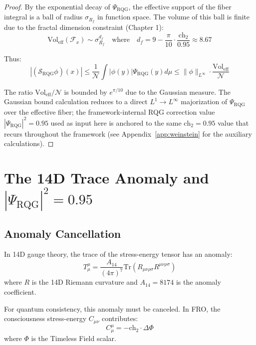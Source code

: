 \begin{proof}
By the exponential decay of $\Psi_{\text{RQG}}$, the effective support of the fiber integral is a ball of radius $\sigma_{R_f}$ in function space. The volume of this ball is finite due to the fractal dimension constraint (Chapter 1):
\begin{equation}
\text{Vol}_{\text{eff}}(\mathcal{F}_x) \sim \sigma_{R_f}^{d_f} \quad \text{where} \quad d_f = 9 - \frac{\pi}{10} \cdot \frac{\text{ch}_2}{0.95} \approx 8.67
\end{equation}

Thus:
\begin{equation}
|(\mathcal{S}_{\text{RQG}} \phi)(x)| \leq \frac{1}{\mathcal{N}} \int |\phi(y)| \Psi_{\text{RQG}}(y) d\mu \leq \|\phi\|_{L^\infty} \cdot \frac{\text{Vol}_{\text{eff}}}{\mathcal{N}}
\end{equation}

The ratio $\text{Vol}_{\text{eff}}/\mathcal{N}$ is bounded by $e^{\pi/10}$ due to the Gaussian measure. The Gaussian bound calculation reduces to a direct $L^1 \to L^\infty$ majorization of $\Psi_{\text{RQG}}$ over the effective fiber; the framework-internal RQG correction value $|\Psi_{\text{RQG}}|^2 = 0.95$ used as input here is anchored to the same $\text{ch}_2 = 0.95$ value that recurs throughout the framework (see Appendix~\ref{app:weinstein} for the auxiliary calculations).
\end{proof}

\section{The 14D Trace Anomaly and $|\Psi_{\text{RQG}}|^2 = 0.95$}

\subsection{Anomaly Cancellation}

In 14D gauge theory, the trace of the stress-energy tensor has an anomaly:
\begin{equation}
T^\mu_\mu = \frac{A_{14}}{(4\pi)^7} \text{Tr}(R_{\mu\nu\rho\sigma} R^{\mu\nu\rho\sigma})
\end{equation}
where $R$ is the 14D Riemann curvature and $A_{14} = 8174$ is the anomaly coefficient.

For quantum consistency, this anomaly must be canceled. In FRO, the consciousness stress-energy $C_{\mu\nu}$ contributes:
\begin{equation}
C^\mu_\mu = -\text{ch}_2 \cdot \Delta \Phi
\end{equation}
where $\Phi$ is the Timeless Field scalar.

